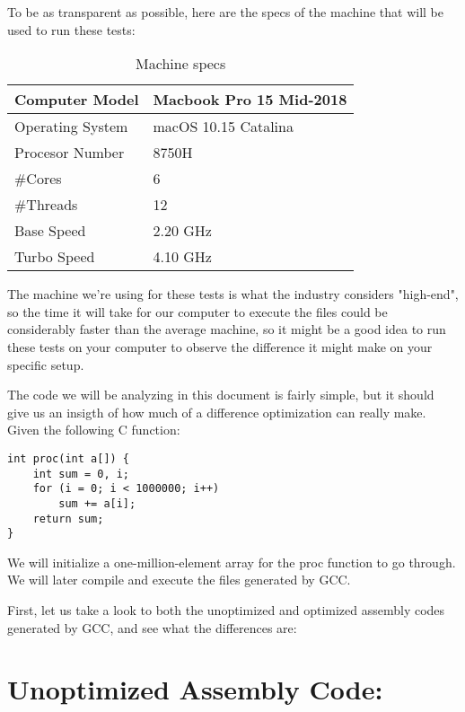 \documentclass[a4paper]{article}
\begin{document}
To be as transparent as possible, here are the specs of the machine that will be used to run these tests: 

\begin{table}[h]
    \centering \begin{tabular}{|l|l|}
        \hline Computer Model  &Macbook Pro 15 Mid-2018   \\
        \hline Operating System &macOS 10.15 Catalina   \\ 
        \hline Procesor Number &8750H   \\ 
        \hline \#Cores         &6       \\ 
        \hline \#Threads       &12      \\ 
        \hline Base Speed      &2.20 GHz \\
        \hline Turbo Speed     &4.10 GHz \\
        \hline \end{tabular} 
        \caption{Machine specs} 
    \label{table:Machine specs} 
\end{table}

The machine we're using for these tests is what the industry considers "high-end", so the time it will take for 
our computer to execute the files could be considerably faster than the average machine, so it might be a good 
idea to run these tests on your computer to observe the difference it might make on your specific setup.

The code we will be analyzing in this document is fairly simple, but it should give us an insigth of how much 
of a difference optimization can really make. Given the following C function: 

\begin{lstlisting} 
int proc(int a[]) {
	int sum = 0, i;
	for (i = 0; i < 1000000; i++)
		sum += a[i];
	return sum;
}
\end{lstlisting}

We will initialize a one-million-element array for the proc function to go through. We will later compile and execute 
the files generated by GCC.

First, let us take a look to both the unoptimized and optimized assembly codes generated by GCC, and see what the differences 
are:

\section{Unoptimized Assembly Code:}
\end{document}
